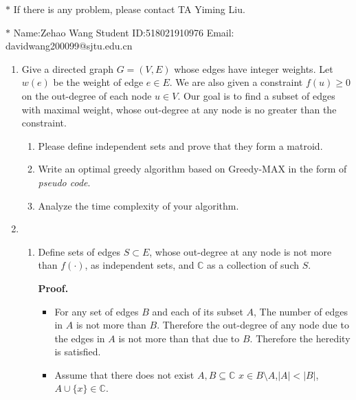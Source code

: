 \documentclass[12pt,a4paper]{article}
\makeatletter
\newtheorem*{solution}{Solution}
\theoremstyle{definition}
\renewenvironment{solution}[1][Solution] {\par\pushQED{\qed}\normalfont\topsep6\p@\@plus6\p@\relax\trivlist\item[\hskip\labelsep\bfseries#1\@addpunct{.}]\ignorespaces}{\popQED\endtrivlist\@endpefalse} \makeatother
\makeatother
\begin{document}
\noindent

\noindent{}
\begin{center}
\footnotesize{\color{red}$*$ If there is any problem, please contact TA Yiming Liu.}

\footnotesize{\color{blue}$*$ Name:Zehao Wang  \quad Student ID:518021910976 \quad Email: davidwang200099@sjtu.edu.cn}
\end{center}

\begin{enumerate}
\item Give a directed graph $G=(V,E)$ whose edges have integer weights. Let $w(e)$ be the weight of edge $e\in E$. We are also given a constraint $f(u)\geq 0$ on the out-degree of each node $u\in V$. Our goal is to find a subset of edges with maximal weight, whose out-degree at any node is no greater than the constraint.
	\begin{enumerate}
	    \item Please define independent sets and prove that they form a matroid.
	    \item Write an optimal greedy algorithm based on Greedy-MAX in the form of \emph{pseudo code}.
	    \item Analyze the time complexity of your algorithm.
	\end{enumerate}
    \begin{solution}
    	\ \\
    	\begin{enumerate}
    		\item 
    		    Define sets of edges $S\subset E$, whose out-degree at any node is not more than $f(\cdot)$, as independent sets, and $\mathbb{C}$ as a collection of such $S$.
    		    
    		    \textbf{Proof.}
    		    \begin{itemize}
    		    	\item 
    		    	For any set of edges $B$ and each of its subset $A$, The number of edges in $A$ is not more than $B$. Therefore the out-degree of any node due to the edges in $A$ is not more than that due to $B$.
    		    	Therefore the heredity is satisfied.
    		    	\item 
    		    	Assume that there does not exist $A,B\subseteq \mathbb{C}$ $x\in B\setminus A$,$|A|<|B|$, $A\cup \{x\}\in \mathbb{C} $.
    		    	

\end{itemize}
\end{enumerate}
\end{solution}
\end{enumerate}
\end{document}
